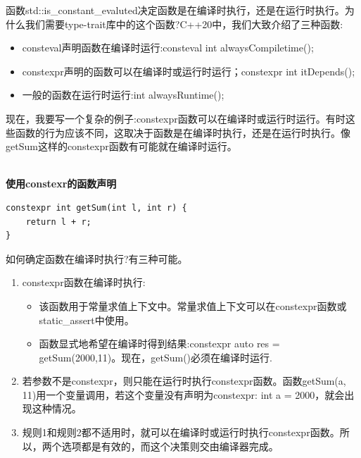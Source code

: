 
函数std::is\_constant\_evaluted决定函数是在编译时执行，还是在运行时执行。为什么我们需要type-trait库中的这个函数?C++20中，我们大致介绍了三种函数:

\begin{itemize}
\item 
consteval声明函数在编译时运行:consteval int alwaysCompiletime();

\item 
constexpr声明的函数可以在编译时或运行时运行；constexpr int itDepends();

\item 
一般的函数在运行时运行:int alwaysRuntime();
\end{itemize}

现在，我要写一个复杂的例子:constexpr函数可以在编译时或运行时运行。有时这些函数的行为应该不同，这取决于函数是在编译时执行，还是在运行时执行。像getSum这样的constexpr函数有可能就在编译时运行。

\hspace*{\fill} \\ %
\noindent
\textbf{使用constexr的函数声明}
\begin{lstlisting}[style=styleCXX]
constexpr int getSum(int l, int r) {
	return l + r;
}
\end{lstlisting}

如何确定函数在编译时执行?有三种可能。

\begin{enumerate}
\item 
constexpr函数在编译时执行:
\begin{itemize}
\item 
该函数用于常量求值上下文中。常量求值上下文可以在constexpr函数或static\_assert中使用。

\item 
函数显式地希望在编译时得到结果:constexpr auto res = getSum(2000,11)。现在，getSum()必须在编译时运行.
\end{itemize}

\item 
若参数不是constexpr，则只能在运行时执行constexpr函数。函数getSum(a, 11)用一个变量调用，若这个变量没有声明为constexpr: int a = 2000，就会出现这种情况。

\item 
规则1和规则2都不适用时，就可以在编译时或运行时执行constexpr函数。所以，两个选项都是有效的，而这个决策则交由编译器完成。
\end{enumerate}

